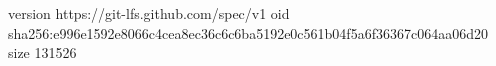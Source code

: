 version https://git-lfs.github.com/spec/v1
oid sha256:e996e1592e8066c4cea8ec36c6c6ba5192e0c561b04f5a6f36367c064aa06d20
size 131526
